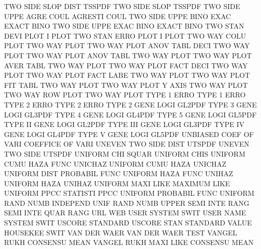 TWO      SIDE SLOP DIST                 TSSPDF
TWO      SIDE SLOP                      TSSPDF
TWO      SIDE UPPE AGRE COUL            AGRESTI  COUL
TWO      SIDE UPPE BINO EXAC            EXACT    BINO
TWO      SIDE UPPE EXAC BINO            EXACT    BINO
TWO      STAN DEVI PLOT                 I        PLOT
TWO      STAN ERRO PLOT                 I        PLOT
TWO      WAY  COLU PLOT                 TWO      WAY  PLOT
TWO      WAY  PLOT ANOV TABL DECI       TWO      WAY  PLOT
TWO      WAY  PLOT ANOV TABL            TWO      WAY  PLOT
TWO      WAY  PLOT AVER TABL            TWO      WAY  PLOT
TWO      WAY  PLOT FACT DECI            TWO      WAY  PLOT
TWO      WAY  PLOT FACT LABE            TWO      WAY  PLOT
TWO      WAY  PLOT FIT  TABL            TWO      WAY  PLOT
TWO      WAY  PLOT Y    AXIS            TWO      WAY  PLOT
TWO      WAY  ROW  PLOT                 TWO      WAY  PLOT
TYPE     1    ERRO                      TYPE     1    ERRO
TYPE     2    ERRO                      TYPE     2    ERRO
TYPE     2    GENE LOGI                 GL2PDF
TYPE     3    GENE LOGI                 GL3PDF
TYPE     4    GENE LOGI                 GL4PDF
TYPE     5    GENE LOGI                 GL5PDF
TYPE     II   GENE LOGI                 GL2PDF
TYPE     III  GENE LOGI                 GL3PDF
TYPE     IV   GENE LOGI                 GL4PDF
TYPE     V    GENE LOGI                 GL5PDF
UNBIASED COEF OF   VARI                 COEFFICE OF   VARI
UNEVEN   TWO  SIDE DIST                 UTSPDF
UNEVEN   TWO  SIDE                      UTSPDF
UNIFORM  CHI  SQUAR                     UNIFORM  CHIS
UNIFORM  CUMU HAZA FUNC                 UNICHAZ
UNIFORM  CUMU HAZA                      UNICHAZ
UNIFORM  DIST                           PROBABIL FUNC
UNIFORM  HAZA FUNC                      UNIHAZ
UNIFORM  HAZA                           UNIHAZ
UNIFORM  MAXI LIKE                      MAXIMUM  LIKE
UNIFORM  PPCC                           STATISTI PPCC
UNIFORM                                 PROBABIL FUNC
UNIFORM  RAND NUMB                      INDEPEND UNIF RAND NUMB
UPPER    SEMI INTE RANG                 SEMI     INTE QUAR RANG
URL                                     WEB
USER                                    SYSTEM   SWIT
USER     NAME                           SYSTEM   SWIT
USCORE                                  STANDARD
USCORE   STAN                           STANDARD
VALUE                                   HOUSEKEE SWIT
VAN      DER  WAER                      VAN      DER  WAER TEST
VANGEL   RUKH                           CONSENSU MEAN
VANGEL   RUKH MAXI LIKE                 CONSENSU MEAN
